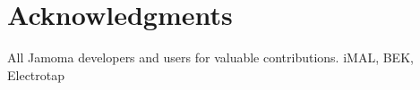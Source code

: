 \documentclass{sig-alternate}
\begin{document}

\section{Acknowledgments} %
\label{sec:acknowledgments}

All Jamoma developers and users for valuable contributions. 
iMAL, BEK, Electrotap





%

%


\balancecolumns %
\end{document}
